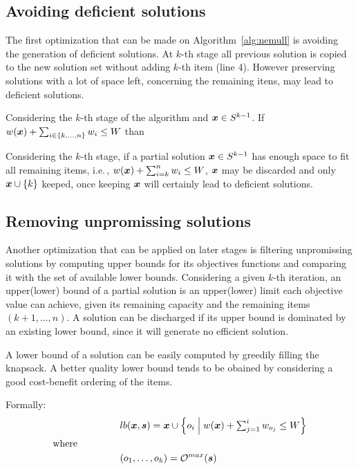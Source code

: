 \subsection{Avoiding deficient solutions}

The first optimization that can be made on Algorithm~\ref{alg:nemull} is
avoiding the generation of deficient solutions.
At $k$-th stage all previous solution is copied to the
new solution set without adding $k$-th item (line 4).
However preserving solutions with a lot of space left, concerning the remaining itens,
may lead to deficient solutions.

\begin{theorem}
   Considering the $k$-th stage of the algorithm and $\boldsymbol{x} \in S^{k-1}$.
   If $w(\boldsymbol{x}) + \sum_{i \in {\{k, \ldots, n\}}} w_i \leq W$ than
\end{theorem}

Considering the $k$-th stage, if a partial solution $\boldsymbol{x} \in S^{k-1}$ has enough
space to fit all remaining items, i.e.\,, $w(\boldsymbol{x}) + \sum_{i=k}^n w_i \leq W$,
$\boldsymbol{x}$ may be discarded and only $\boldsymbol{x} \cup \{k\}$ keeped, once
keeping $\boldsymbol{x}$ will certainly lead to deficient solutions.

\subsection{Removing unpromissing solutions}

Another optimization that can be applied on later stages is
filtering unpromissing solutions by computing upper bounds for its objectives
functions and comparing it with the set of available lower bounds.
Considering a given $k$-th iteration, an upper(lower) bound of a partial solution
is an upper(lower) limit each objective value can achieve,
given its remaining capacity and the remaining items $(k+1, \ldots, n)$.
A solution can be discharged if its upper bound is dominated by an existing lower bound, since it will generate no efficient solution.

A lower bound of a solution can be easily computed by greedily filling the
knapsack.
A better quality lower bound tends to be obained by considering a good
cost-benefit ordering of the items.

Formally:
\begin{align*}
    &lb(\boldsymbol{x}, \boldsymbol{s}) = \boldsymbol{x} \cup
      \left\{ o_i \;\middle|\; w(\boldsymbol{x}) + \textstyle\sum_{j=1}^i w_{o_j} \leq W \right\} \\
  \text{where} \phantom{mmmmm} \\
    &(o_1, \ldots, o_k) = \mathcal{O}^{max}(\boldsymbol{s}) \\
\end{align*}

